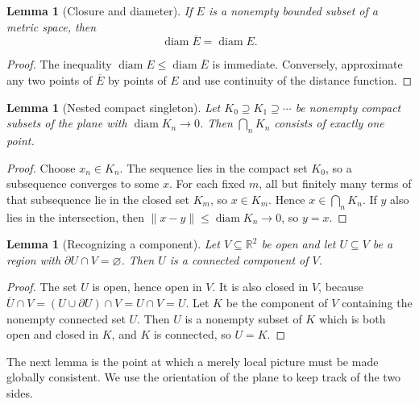 \documentclass[11pt]{article}
\theoremstyle{mainplain}
\newtheorem{lemma}[theorem]{Lemma}
\theoremstyle{mainroman}
\theoremstyle{definition}
\numberwithin{equation}{section}
\begin{document}
\begin{lemma}[Closure and diameter]\label{lem:diameter-closure}
If $E$ is a nonempty bounded subset of a metric space, then
\[
 \operatorname{diam}\overline E=\operatorname{diam}E.
\]
\end{lemma}
\begin{proof}
The inequality $\operatorname{diam}E\le
\operatorname{diam}\overline E$ is immediate. Conversely, approximate
any two points of $\overline E$ by points of $E$ and use continuity of
the distance function.
\end{proof}

\begin{lemma}[Nested compact singleton]\label{lem:nested-compact}
Let $K_0\supseteq K_1\supseteq\cdots$ be nonempty compact subsets of
the plane with $\operatorname{diam}K_n\to0$. Then $\bigcap_nK_n$
consists of exactly one point.
\end{lemma}
\begin{proof}
Choose $x_n\in K_n$. The sequence lies in the compact set $K_0$, so a
subsequence converges to some $x$. For each fixed $m$, all but
finitely many terms of that subsequence lie in the closed set $K_m$,
so $x\in K_m$. Hence $x\in\bigcap_nK_n$. If $y$ also lies in the
intersection, then $\|x-y\|\le\operatorname{diam}K_n\to0$, so $y=x$.
\end{proof}

\begin{lemma}[Recognizing a component]\label{lem:clopen-component}
Let $V\subseteq\mathbb R^2$ be open and let $U\subseteq V$ be a region
with $\partial U\cap V=\varnothing$. Then $U$ is a connected component
of $V$.
\end{lemma}
\begin{proof}
The set $U$ is open, hence open in $V$. It is also closed in $V$,
because
$\overline U\cap V=(U\cup\partial U)\cap V=U\cap V=U$. Let $K$ be the
component of $V$ containing the nonempty connected set $U$. Then $U$ is
a nonempty subset of $K$ which is both open and closed in $K$, and $K$
is connected, so $U=K$.
\end{proof}

The next lemma is the point at which a merely local picture must be
made globally consistent. We use the orientation of the plane to keep
track of the two sides.
\end{document}
